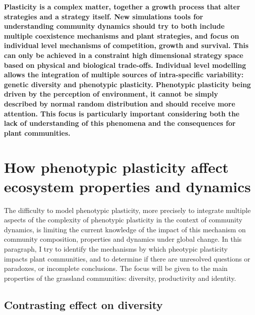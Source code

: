 




\textbf{Plasticity is a complex matter, together a growth process that alter strategies and a strategy itself. New simulations tools for understanding community dynamics should try to both include multiple coexistence mechanisms and plant strategies, and focus on individual level mechanisms of competition, growth and survival. This can only be achieved in a constraint high dimensional strategy space based on physical and biological trade-offs. Individual level modelling allows the integration of multiple sources of intra-specific variability: genetic diversity and phenotypic plasticity. Phenotypic plasticity being driven by the perception of environment, it cannot be simply described by normal random distribution and should receive more attention. This focus is particularly important considering both the lack of understanding of this phenomena and the consequences for plant communities.}


\section{How phenotypic plasticity affect ecosystem properties and dynamics}

The difficulty to model phenotypic plasticity, more precisely to integrate multiple aspects of the complexity of phenotypic plasticity in the context of community dynamics, is limiting the current knowledge of the impact of this mechanism on community composition, properties and dynamics under global change. In this paragraph, I try to identify the mechanisms by which pheotypic plasticity impacts plant communities, and to determine if there are unresolved questions or paradoxes, or incomplete conclusions. The focus will be given to the main properties of the grassland communities: diversity, productivity and identity.



\subsection{Contrasting effect on diversity}

